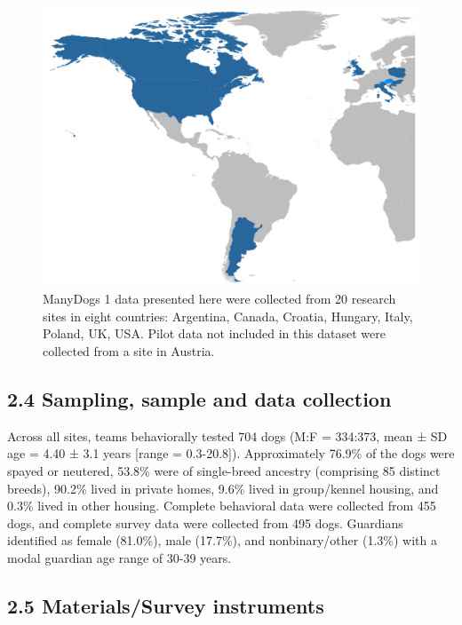 \documentclass[
  man,floatsintext]{apa6}
\begin{document}
\begin{figure}

{\centering \includegraphics[width=0.8\linewidth]{md1_countries} 

}

\caption{ManyDogs 1 data presented here were collected from 20 research sites in eight countries: Argentina, Canada, Croatia, Hungary, Italy, Poland, UK, USA. Pilot data not included in this dataset were collected from a site in Austria.}\label{fig:countries}
\end{figure}

\hypertarget{sampling-sample-and-data-collection}{%
\subsection{2.4 Sampling, sample and data collection}\label{sampling-sample-and-data-collection}}

Across all sites, teams behaviorally tested 704 dogs (M:F = 334:373, mean ± SD age = 4.40 ± 3.1 years {[}range = 0.3-20.8{]}). Approximately 76.9\% of the dogs were spayed or neutered, 53.8\% were of single-breed ancestry (comprising 85 distinct breeds), 90.2\% lived in private homes, 9.6\% lived in group/kennel housing, and 0.3\% lived in other housing. Complete behavioral data were collected from 455 dogs, and complete survey data were collected from 495 dogs. Guardians identified as female (81.0\%), male (17.7\%), and nonbinary/other (1.3\%) with a modal guardian age range of 30-39 years.

\hypertarget{materialssurvey-instruments}{%
\subsection{2.5 Materials/Survey instruments}\label{materialssurvey-instruments}}
\end{document}
